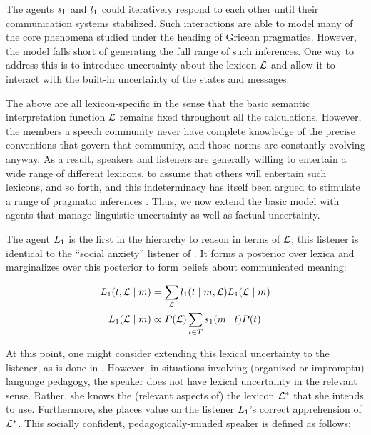 
The agents $s_{1}$ and $l_{1}$ could iteratively respond
to each other until their communication systems stabilized. Such
interactions are able to model many of the core phenomena studied
under the heading of Gricean pragmatics.  However, the model falls
short of generating the full range of such inferences.  One way to
address this is to introduce uncertainty about the lexicon $\mathcal{L}$ and
allow it to interact with the built-in uncertainty of the states and
messages.

The above are all lexicon-specific in the sense that the basic
semantic interpretation function $\mathcal{L}$ remains fixed throughout all
the calculations.  However, the members a speech community never have
complete knowledge of the precise conventions that govern that
community, and those norms are constantly evolving anyway. As a
result, speakers and listeners are generally willing to entertain a
wide range of different lexicons, to assume that others will entertain
such lexicons, and so forth, and this indeterminacy has itself been
argued to stimulate a range of pragmatic inferences
\cite{Bergen:Goodman:Levy:2012,Bergen:Goodman:2014}. Thus, we now
extend the basic model with agents that manage linguistic uncertainty
as well as factual uncertainty.

The agent $\ListenerOne$ is the first in the hierarchy to reason in
terms of $\mathcal{L}$; this listener is identical to the ``social anxiety''
listener of \cite{Smith:Goodman:Frank:2013}. It forms a posterior over
lexica and marginalizes over this posterior to form beliefs about
communicated meaning:

\begin{definition}[$\ListenerOne$]\label{def:l1}
  \begin{align*}
  L_{1}(t, \mathcal{L} \mid m) 
  &= 
  \sum_{\mathcal{L}} l_{1}(t \mid m, \mathcal{L}) L_{1}(\mathcal{L} \mid m) 
  \\
  L_{1}(\mathcal{L} \mid m) &\propto P(\mathcal{L}) \sum_{t\in T} s_{1}(m \mid t)P(t)
  \end{align*}
\end{definition}


At this point, one might consider extending this lexical uncertainty
to the listener, as is done in \cite{Smith:Goodman:Frank:2013}.
However, in situations involving (organized or impromptu) language
pedagogy, the speaker does not have lexical uncertainty in the
relevant sense.  Rather, she knows the (relevant aspects of) the
lexicon $\mathcal{L}^{\ast}$ that she intends to use. Furthermore, she places
value on the listener $\ListenerOne$'s correct apprehension of
$\mathcal{L}^{\ast}$. This socially confident, pedagogically-minded speaker is
defined as follows:

